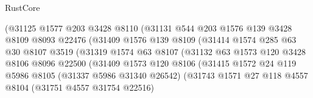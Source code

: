 \begin{lexlean}{RustCore}
\begin{coremodule}
                                (@31125
                                  @1577
                                  @203
                                  @3428
                                  @8110
                                  (@31131
                                    @544
                                    @203
                                    @1576
                                    @139
                                    @3428
                                    @8109
                                    @8093
                                    @22476
                                    (@31409
                                      @1576
                                      @139
                                      @8109
                                      (@31414
                                        @1574
                                        @285
                                        @63
                                        @30
                                        @8107
                                        @3519
                                        (@31319
                                          @1574
                                          @63
                                          @8107
                                          (@31132
                                            @63
                                            @1573
                                            @120
                                            @3428
                                            @8106
                                            @8096
                                            @22500
                                            (@31409
                                              @1573
                                              @120
                                              @8106
                                              (@31415
                                                @1572
                                                @24
                                                @119
                                                @5986
                                                @8105
                                                (@31337 @5986 @31340 @26542)
                                                (@31743
                                                  @1571
                                                  @27
                                                  @118
                                                  @4557
                                                  @8104
                                                  (@31751 @4557 @31754 @22516)

\end{coremodule}
\end{lexlean}
